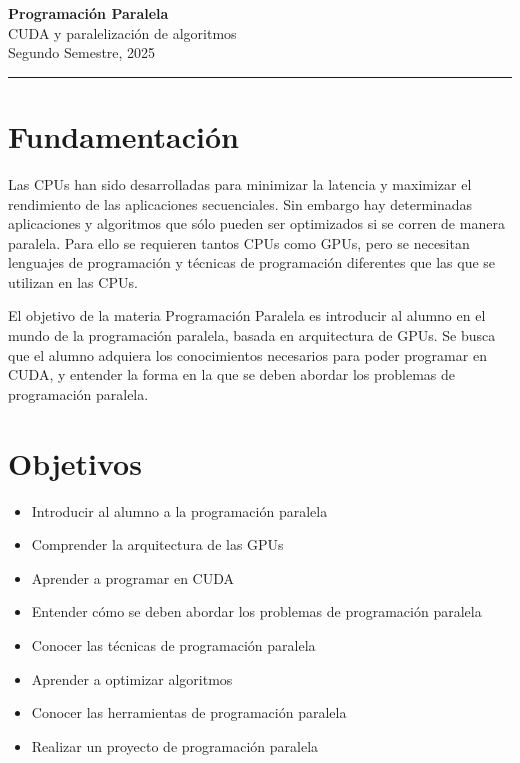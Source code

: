 



\begin{center}
    \LARGE\textbf{Programación Paralela} \\
    \Large{CUDA y paralelización de algoritmos} \\
    \normalsize{Segundo Semestre, 2025} \\
    \vspace{1em}
    \hrule
\end{center}

\vspace{1em}


\section*{Fundamentación}
Las CPUs han sido desarrolladas para minimizar la latencia y maximizar el rendimiento de las aplicaciones secuenciales.
Sin embargo hay determinadas aplicaciones y algoritmos que sólo pueden ser optimizados si se corren de manera paralela.
Para ello se requieren tantos CPUs como GPUs, pero se necesitan lenguajes de programación y técnicas de programación
diferentes que las que se utilizan en las CPUs.

El objetivo de la materia Programación Paralela es introducir al alumno en el mundo de la programación paralela, basada
en arquitectura de GPUs. Se busca que el alumno adquiera los conocimientos necesarios para poder programar en CUDA, y
entender la forma en la que se deben abordar los problemas de programación paralela.

\section*{Objetivos}
\begin {itemize}
  \item Introducir al alumno a la programación paralela
  \item Comprender la arquitectura de las GPUs
  \item Aprender a programar en CUDA
  \item Entender cómo se deben abordar los problemas de programación paralela
  \item Conocer las técnicas de programación paralela
  \item Aprender a optimizar algoritmos
  \item Conocer las herramientas de programación paralela
  \item Realizar un proyecto de programación paralela
\end {itemize}


